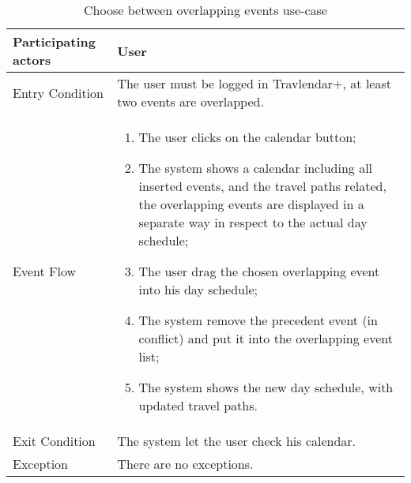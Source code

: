 \begin{table}[H]
	\begin{center}
		\begin{tabular}{ | p{} | p{} | }
		\hline
		Participating actors & User\\
		\hline
		Entry Condition & The user must be logged in Travlendar+, at least two events are overlapped.\\
		\hline
		Event Flow & 
			\begin{enumerate}
				\item The user clicks on the calendar button;
				\item The system shows a calendar including all inserted events, and the travel paths related, the overlapping events are displayed in a separate way in respect to the actual day schedule;
				\item The user drag the chosen overlapping event into his day schedule;
				\item The system remove the precedent event (in conflict) and put it into the overlapping event list;
				\item The system shows the new day schedule, with updated travel paths.
			\end{enumerate} \\
		\hline
		Exit Condition & The system let the user check his calendar. \\
		\hline
		Exception & There are no exceptions.\\ 
		\hline
		\end{tabular}
	\end{center}
	\caption{Choose between overlapping events use-case}
\end{table}